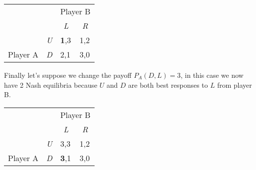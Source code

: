 \documentclass[twoside]{article}
\begin{document}
\begin{enumerate}
\begin{enumerate}
        \begin{center}
            \begin{tabular}{llll}
                                       &                                 & \multicolumn{2}{c}{Player B}                                                      \\
                                       &                                 & \multicolumn{1}{c}{\textit{L}}                   & \multicolumn{1}{c}{\textit{R}} \\ \cline{3-4} 
                                       & \multicolumn{1}{l|}{\textit{U}} & \multicolumn{1}{l|}{\textbf{1},3}                & \multicolumn{1}{l|}{1,2}       \\ \cline{3-4} 
            \multirow{-2}{*}{Player A} & \multicolumn{1}{l|}{\textit{D}} & \multicolumn{1}{l|}{\cellcolor[HTML]{FFCCC9}2,1} & \multicolumn{1}{l|}{3,0}       \\ \cline{3-4} 
            \end{tabular}
        \end{center}
        
        Finally let's suppose we change the payoff $P_A(D, L) = 3$, in this case we now have 2 Nash equilibria because $U$ and $D$ are both best responses to $L$ from player B. \\
        
        \begin{center}
            \begin{tabular}{llll}
                                       &                                 & \multicolumn{2}{c}{Player B}                                                               \\
                                       &                                 & \multicolumn{1}{c}{\textit{L}}                            & \multicolumn{1}{c}{\textit{R}} \\ \cline{3-4} 
                                       & \multicolumn{1}{l|}{\textit{U}} & \multicolumn{1}{l|}{\cellcolor[HTML]{FFCCC9}3,3}          & \multicolumn{1}{l|}{1,2}       \\ \cline{3-4} 
            \multirow{-2}{*}{Player A} & \multicolumn{1}{l|}{\textit{D}} & \multicolumn{1}{l|}{\cellcolor[HTML]{FFCCC9}\textbf{3},1} & \multicolumn{1}{l|}{3,0}       \\ \cline{3-4} 
            \end{tabular}
        \end{center}


\end{enumerate}
\end{enumerate}
\end{document}
